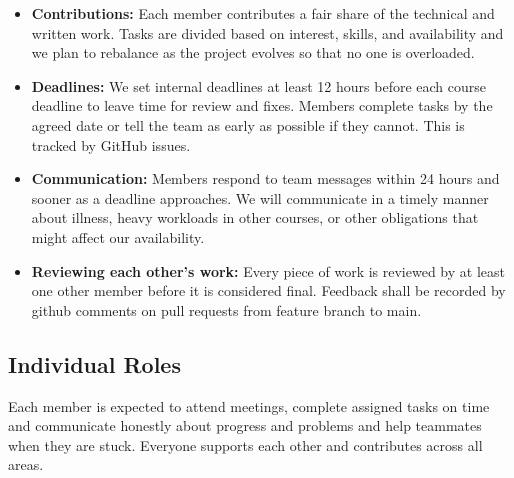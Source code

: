\documentclass[12pt]{article}
\begin{document}
\begin{itemize}
  \item \textbf{Contributions:} Each member contributes a fair share of the technical and written work. Tasks are divided based on interest, skills, and availability and we plan to rebalance as the project evolves so that no one is overloaded.
  \item \textbf{Deadlines:} We set internal deadlines at least 12 hours before each course deadline to leave time for review and fixes. Members complete tasks by the agreed date or tell the team as early as possible if they cannot. This is tracked by GitHub issues. 
  \item \textbf{Communication:} Members respond to team messages within 24 hours and sooner as a deadline approaches. We will communicate in a timely manner  about illness, heavy workloads in other courses, or other obligations that might affect our availability.
  \item \textbf{Reviewing each other's work:} Every piece of work is reviewed by at least one other member before it is considered final. Feedback shall be recorded by github comments on pull requests from feature branch to main. 
\end{itemize}

\subsection{Individual Roles}
 Each member is expected to attend meetings, complete assigned tasks on time and communicate honestly about progress and problems and help teammates when they are stuck. Everyone supports each other and contributes across all areas.
\end{document}
